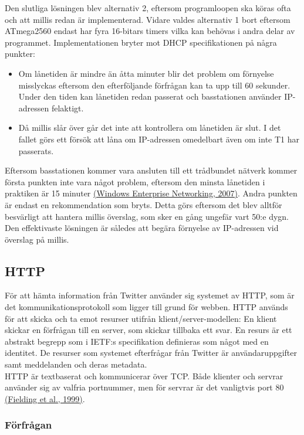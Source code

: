 \documentclass[a4paper,11pt]{article}
\begin{document}
Den slutliga lösningen blev alternativ 2, eftersom programloopen ska köras ofta och att millis redan är implementerad. Vidare valdes alternativ 1 bort eftersom ATmega2560 endast har fyra 16-bitars timers vilka kan behövas i andra delar av programmet. Implementationen bryter mot DHCP specifikationen på några punkter:

	\begin{itemize}
	\item Om lånetiden är mindre än åtta minuter blir det problem om förnyelse misslyckas eftersom den efterföljande förfrågan kan ta upp till 60 sekunder. Under den tiden kan lånetiden redan passerat och basstationen använder IP-adressen felaktigt.
    	\item Då millis slår över går det inte att kontrollera om lånetiden är slut. I det fallet görs ett försök att låna om IP-adressen omedelbart även om inte T1 har passerats.
	\end{itemize}	

Eftersom basstationen kommer vara ansluten till ett trådbundet nätverk kommer första punkten inte vara något problem, eftersom den minsta lånetiden i praktiken är 15 minuter \hyperref[wen]{(Windows Enterprise Networking, 2007)}. Andra punkten är endast en rekommendation som bryts. Detta görs eftersom det blev alltför besvärligt att hantera millis överslag, som sker en gång ungefär vart 50:e dygn. Den effektivaste lösningen är således att begära förnyelse av IP-adressen vid överslag på millis.
	
\subsection{HTTP}
För att hämta information från Twitter använder sig systemet av HTTP, som är det kommunikationsprotokoll som ligger till grund för webben. HTTP används för att skicka och ta emot resurser utifrån klient/server-modellen: En klient skickar en förfrågan till en server, som skickar tillbaka ett svar. En resurs är ett abstrakt begrepp som i IETF:s specifikation definieras som något med en identitet. De resurser som systemet efterfrågar från Twitter är användaruppgifter samt meddelanden och deras metadata. \\

HTTP är textbaserat och kommunicerar över TCP. Både klienter och servrar använder sig av valfria portnummer, men för servrar är det vanligtvis port 80 \hyperref[rfc2616]{(Fielding et al., 1999)}.

\subsubsection{Förfrågan}
\end{document}
